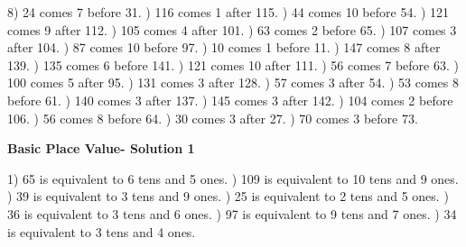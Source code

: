 \documentclass{article}%
\begin{document}
8) 24 comes 7 before 31.%
) 116 comes 1 after 115.%
) 44 comes 10 before 54.%
) 121 comes 9 after 112.%
) 105 comes 4 after 101.%
) 63 comes 2 before 65.%
) 107 comes 3 after 104.%
) 87 comes 10 before 97.%
) 10 comes 1 before 11.%
) 147 comes 8 after 139.%
) 135 comes 6 before 141.%
) 121 comes 10 after 111.%
) 56 comes 7 before 63.%
) 100 comes 5 after 95.%
) 131 comes 3 after 128.%
) 57 comes 3 after 54.%
) 53 comes 8 before 61.%
) 140 comes 3 after 137.%
) 145 comes 3 after 142.%
) 104 comes 2 before 106.%
) 56 comes 8 before 64.%
) 30 comes 3 after 27.%
) 70 comes 3 before 73.%
\newline%
\newpage%
\large%
\begin{center}%
\textbf{Basic Place Value- Solution 1}%
\newline%
\end{center} \normalsize%
1) 65 is equivalent to  6 tens and 5 ones.%
) 109 is equivalent to  10 tens and 9 ones.%
) 39 is equivalent to  3 tens and 9 ones.%
) 25 is equivalent to  2 tens and 5 ones.%
) 36 is equivalent to  3 tens and 6 ones.%
) 97 is equivalent to  9 tens and 7 ones.%
) 34 is equivalent to  3 tens and 4 ones.%
\end{document}
